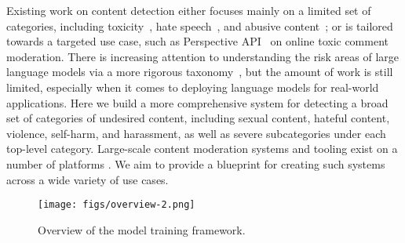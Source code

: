 \documentclass[letterpaper]{article} %
\begin{document}
Existing work on content detection either focuses mainly on a limited set of categories, including toxicity~\cite{pavlopoulos2020toxicity,gehman2020realtoxicityprompts}, hate speech~\cite{kwok2013hate,davidson2017automated}, and abusive content~\cite{nobata2016abusive,vidgen2019challenges}; or is tailored towards a targeted use case, such as Perspective API~\cite{perspective_api} on online toxic comment moderation. There is increasing attention to understanding the risk areas of large language models via a more rigorous taxonomy~\cite{weidinger2021ethical}, but the amount of work is still limited, especially when it comes to deploying language models for real-world applications. Here we build a more comprehensive system for detecting a broad set of categories of undesired content, including sexual content, hateful content, violence, self-harm, and harassment, as well as severe subcategories under each top-level category. Large-scale content moderation systems and tooling exist on a number of platforms \cite{youtube2019harmful, reddit2022tools}. We aim to provide a blueprint for creating such systems across a wide variety of use cases.


\begin{figure}
\texttt{[image: figs/overview-2.png]}
\caption{Overview of the model training framework.}
\label{fig:overview}
\end{figure}
\end{document}
